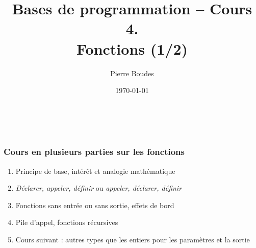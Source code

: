 \documentclass[xcolor=pdftex,svgnames,table]{beamer}
\title{Bases de programmation -- Cours 4.\\ Fonctions (1/2)}
\author{Pierre Boudes}
\date{\today}
\begin{document}
\begin{frame}
	\titlepage
	\vfill
	\begin{center}
		\\[2.5ex]
		{\tiny\CcNote{\CcLongnameByNcSa}}
		\vspace*{-2.5ex}
	\end{center}
\end{frame}



\begin{frame}
  \frametitle{Cours en plusieurs parties sur les fonctions \nowrite}

\begin{enumerate}
    \item Principe de base, intérêt et analogie mathématique
      \item \emph{Déclarer, appeler, définir} ou \emph{appeler, déclarer, définir}
    \item Fonctions sans entrée ou sans sortie, effets de bord
    \item Pile d'appel, fonctions récursives
    \item Cours suivant : autres types que les entiers pour les paramètres et la sortie
  \end{enumerate}
\end{frame}

\section[Plan]{}
\end{document}
